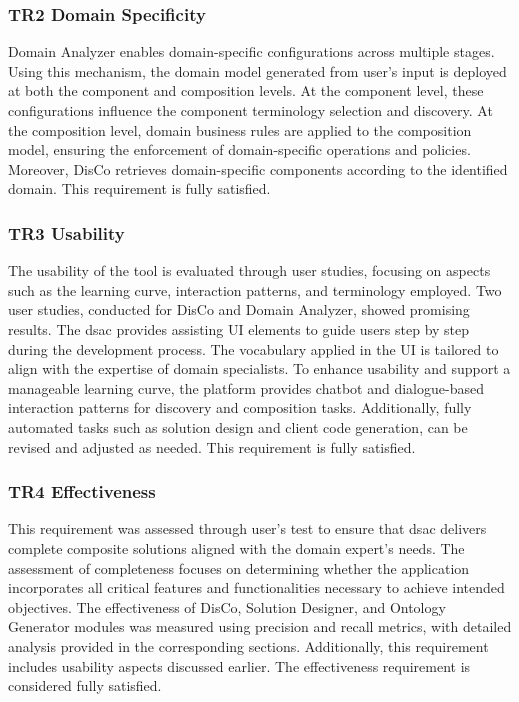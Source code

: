 \subsubsection*{TR2 Domain Specificity}
Domain Analyzer enables domain-specific configurations across multiple stages. Using this mechanism, the domain model generated from user’s input is deployed at both the component and composition levels. At the component level, these configurations influence the component terminology selection and discovery. At the composition level, domain business rules are applied to the composition model, ensuring the enforcement of domain-specific operations and policies. Moreover, DisCo retrieves domain-specific components according to the identified domain. This requirement is fully satisfied.

\subsubsection*{TR3 Usability}
The usability of the tool is evaluated through user studies, focusing on aspects such as the learning curve, interaction patterns, and terminology employed. Two user studies, conducted for DisCo and Domain Analyzer, showed promising results. The \gls{dsac} provides assisting UI elements to guide users step by step during the development process. The vocabulary applied in the UI is tailored to align with the expertise of domain specialists. To enhance usability and support a manageable learning curve, the platform provides chatbot and dialogue-based interaction patterns for discovery and composition tasks. Additionally, fully automated tasks such as solution design and client code generation, can be revised and adjusted as needed. This requirement is fully satisfied.

\subsubsection*{TR4 Effectiveness}
This requirement was assessed through user’s test to ensure that \gls{dsac} delivers complete composite solutions aligned with the domain expert's needs. The assessment of completeness focuses on determining whether the application incorporates all critical features and functionalities necessary to achieve intended objectives. The effectiveness of DisCo, Solution Designer, and Ontology Generator modules was measured using precision and recall metrics, with detailed analysis provided in the corresponding sections. Additionally, this requirement includes usability aspects discussed earlier. The effectiveness requirement is considered fully satisfied.

